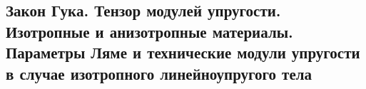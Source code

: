

\subsection{Закон Гука. Тензор модулей упругости. Изотропные и анизотропные материалы. Параметры Ляме и технические модули упругости в случае изотропного линейноупругого тела}



